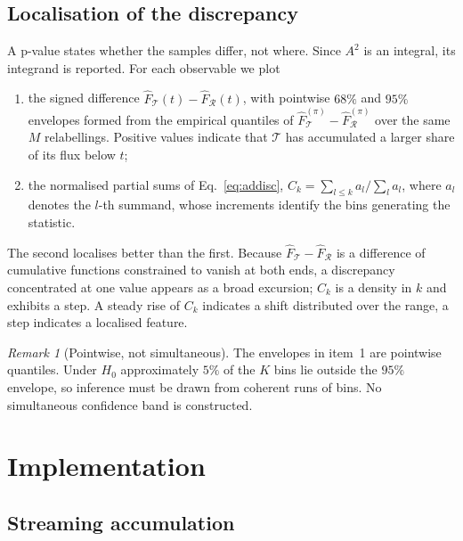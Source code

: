 \documentclass[11pt,a4paper]{article}
\theoremstyle{definition}
\theoremstyle{plain}
\theoremstyle{remark}
\newtheorem{remark}{Remark}[section]
\newcommand{\Rr}{\mathcal{R}}
\newcommand{\Tt}{\mathcal{T}}
\begin{document}
\subsection{Localisation of the discrepancy}
\label{sec:profile}

A p-value states whether the samples differ, not where. Since $A^2$ is an
integral, its integrand is reported. For each observable we plot

\begin{enumerate}
\item the signed difference $\hat{F}_\Tt(t) - \hat{F}_\Rr(t)$, with pointwise
$68\%$ and $95\%$ envelopes formed from the empirical quantiles of
$\hat{F}^{(\pi)}_\Tt - \hat{F}^{(\pi)}_\Rr$ over the same $M$ relabellings.
Positive values indicate that $\Tt$ has accumulated a larger share of its flux
below $t$;
\item the normalised partial sums of Eq.~\eqref{eq:addisc},
$C_k = \sum_{l \le k} a_l \big/ \sum_{l} a_l$, where $a_l$ denotes the $l$-th
summand, whose increments identify the bins generating the statistic.
\end{enumerate}

The second localises better than the first. Because $\hat{F}_\Tt - \hat{F}_\Rr$
is a difference of cumulative functions constrained to vanish at both ends, a
discrepancy concentrated at one value appears as a broad excursion; $C_k$ is a
density in $k$ and exhibits a step. A steady rise of $C_k$ indicates a shift
distributed over the range, a step indicates a localised feature.

\begin{remark}[Pointwise, not simultaneous]
The envelopes in item~1 are pointwise quantiles. Under $H_0$ approximately
$5\%$ of the $K$ bins lie outside the $95\%$ envelope, so inference must be
drawn from coherent runs of bins. No simultaneous confidence band is
constructed.
\end{remark}

\section{Implementation}

\subsection{Streaming accumulation}
\end{document}
